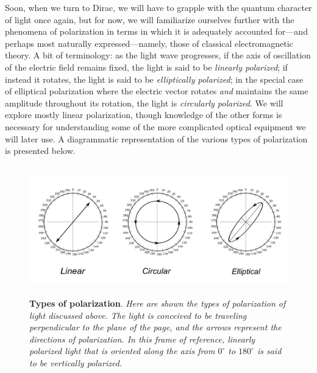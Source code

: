 Soon, when we turn to Dirac, we will have to grapple with the quantum character of light once again, but for now, we
will familiarize ourselves further with the phenomena of polarization in terms in which it is adequately accounted 
for---and perhaps most naturally expressed---namely, those of classical electromagnetic theory. A bit of terminology: as the light wave progresses, if the axis of oscillation of the electric field remains fixed, the light is said to be \emph{linearly polarized}; if instead it rotates, the light is said to be \emph{elliptically polarized}; in the special case of elliptical polarization where the electric vector rotates \emph{and} maintains the same amplitude through\-out its rotation, the light is \emph{circularly polarized}. We will explore mostly linear polarization, though knowledge of the other forms is necessary for understanding some of the more com\-pli\-cat\-ed optical equipment we will later use. A diagrammatic representation of the various types of polarization is presented below.

\begin{figure}[h]
\centering
  \captionsetup{width=5.5in}
  \includegraphics[width=5.37125in,height=2.215in]{images/11_polarization/linear-circular-elliptical.png}
  \caption*{\textbf{Types of polarization}. \emph{Here are shown the types of polarization of light discussed above. 
  The light is conceived to be traveling perpendicular to the plane of the page, and the arrows represent the directions
  of polarization. In this frame of reference, linearly polarized light that is oriented along the axis from $0^{\circ}$ to $180^{\circ}$ is said
  to be vertically polarized.}}
\end{figure}

